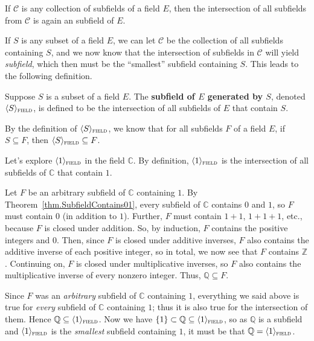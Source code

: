 \begin{theorem}\label{thm.IntersectCollectionFields}
If $\mathcal{C}$ is any collection of subfields of a field $E$, then the intersection of all subfields from $\mathcal{C}$ is again an subfield of $E$.
\end{theorem}


If $S$ is any subset of a field $E$, we can let $\mathcal{C}$ be the collection of all subfields containing $S$, and we now know that the intersection of subfields in $\mathcal{C}$ will yield \emph{subfield}, which then must be the ``smallest'' subfield containing $S$. This leads to the following definition. 


\begin{definition}\label{def.GenerateField}
Suppose $S$ is a subset of a field $E$. The \textbf{subfield of $E$ generated by $S$}, denoted $\langle S \rangle_{\textsc{field}}$, is defined to be the intersection of all subfields of $E$ that contain $S$.
\end{definition}

\begin{remark}
By the definition of $\langle S \rangle_{\textsc{field}}$, we know that for all subfields $F$ of a field $E$, if $S\subseteq F$, then $\langle S \rangle_{\textsc{field}} \subseteq F$.
\end{remark}

\begin{example}\label{exam.GenerateField}
Let's explore  $\langle 1 \rangle_{\textsc{field}}$ in the field $\mathbb{C}$. By definition,  $\langle 1 \rangle_{\textsc{field}}$ is the intersection of all subfields of $\mathbb{C}$ that contain $1$. 

Let $F$ be an arbitrary subfield of $\mathbb{C}$ containing $1$. By Theorem~\ref{thm.SubfieldContains01}, every subfield of $\mathbb{C}$ contains $0$ and $1$, so $F$ must  contain $0$ (in addition to $1$). Further, $F$ must contain $1+1$, $1+1+1$, etc., because $F$ is closed under addition. So, by induction,  $F$ contains the positive integers and $0$. Then, since $F$ is closed under additive inverses, $F$ also contains the additive inverse of each positive integer, so in total, we now see that $F$ contains $\mathbb{Z}$. Continuing on, $F$ is closed under multiplicative inverses, so $F$ also contains the multiplicative inverse of every nonzero integer. Thus, $\mathbb{Q} \subseteq F$. 

Since $F$ was an \emph{arbitrary} subfield of $\mathbb{C}$ containing $1$, everything we said above  is true for \emph{every} subfield of $\mathbb{C}$ containing $1$; thus it is also true for the intersection of them. Hence $\mathbb{Q} \subseteq \langle 1 \rangle_{\textsc{field}}$. Now we have $\{1\} \subset \mathbb{Q} \subseteq \langle 1 \rangle_{\textsc{field}}$, so as $\mathbb{Q}$ is a subfield and $\langle 1 \rangle_{\textsc{field}}$ is the \emph{smallest} subfield containing $1$, it must be that $\mathbb{Q} = \langle 1 \rangle_{\textsc{field}}$.
\end{example}


